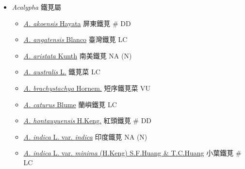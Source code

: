 
  \begin{itemize}
 \item[] \textit{Acalypha} 鐵莧屬
                                
  \begin{itemize}
        \item[] \href{http://www.theplantlist.org/tpl1.1/search?q=Acalypha+akoensis}{\textit{A. akoensis} Hayata}   屏東鐵莧  \# DD
        \item[] \href{http://www.theplantlist.org/tpl1.1/search?q=Acalypha+angatensis}{\textit{A. angatensis} Blanco}   臺灣鐵莧   LC
        \item[] \href{http://www.theplantlist.org/tpl1.1/search?q=Acalypha+aristata}{\textit{A. aristata} Kunth}   南美鐵莧   NA (N)
        \item[] \href{http://www.theplantlist.org/tpl1.1/search?q=Acalypha+australis}{\textit{A. australis} L.}   鐵莧菜   LC
        \item[] \href{http://www.theplantlist.org/tpl1.1/search?q=Acalypha+brachystachya}{\textit{A. brachystachya} Hornem.}   短序鐵莧菜   VU
        \item[] \href{http://www.theplantlist.org/tpl1.1/search?q=Acalypha+caturus}{\textit{A. caturus} Blume}   蘭嶼鐵莧   LC
        \item[] \href{http://www.theplantlist.org/tpl1.1/search?q=Acalypha+hontauyuensis}{\textit{A. hontauyuensis} H.Keng.}   紅頭鐵莧  \# DD
        \item[] \href{http://www.theplantlist.org/tpl1.1/search?q=Acalypha+indica+var.+indica}{\textit{A. indica} L. var. \textit{indica}}   印度鐵莧   NA (N)
        \item[] \href{http://www.theplantlist.org/tpl1.1/search?q=Acalypha+indica+var.+minima}{\textit{A. indica} L. var. \textit{minima} (H.Keng) S.F.Huang \& T.C.Huang}   小葉鐵莧  \# LC

\end{itemize}
\end{itemize}
